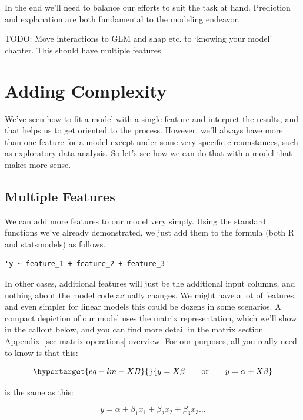 \documentclass[
  letterpaper,
]{krantz}
\begin{document}
In the end we'll need to balance our efforts to suit the task at hand.
Prediction and explanation are both fundamental to the modeling
endeavor.

TODO: Move interactions to GLM and shap etc. to `knowing your model'
chapter. This should have multiple features

\section{Adding Complexity}\label{sec-lm-complexity}

We've seen how to fit a model with a single feature and interpret the
results, and that helps us to get oriented to the process. However,
we'll always have more than one feature for a model except under some
very specific circumstances, such as exploratory data analysis. So let's
see how we can do that with a model that makes more sense.

\subsection{Multiple Features}\label{sec-lm-multiple-features}

We can add more features to our model very simply. Using the standard
functions we've already demonstrated, we just add them to the formula
(both R and statsmodels) as follows.

\begin{verbatim}
'y ~ feature_1 + feature_2 + feature_3'
\end{verbatim}

In other cases, additional features will just be the additional input
columns, and nothing about the model code actually changes. We might
have a lot of features, and even simpler for linear models this could be
dozens in some scenarios. A compact depiction of our model uses the
matrix representation, which we'll show in the callout below, and you
can find more detail in the matrix section
Appendix~\ref{sec-matrix-operations} overview. For our purposes, all you
really need to know is that this:

\begin{equation}\protect\hypertarget{eq-lm-XB}{}{
y = X\beta\qquad  \textrm{or}\qquad y = \alpha + X\beta
}\label{eq-lm-XB}\end{equation}

is the same as this:

\[
y = \alpha + \beta_1 x_1 + \beta_2 x_2 + \beta_3 x_3 \dots
\]
\end{document}
